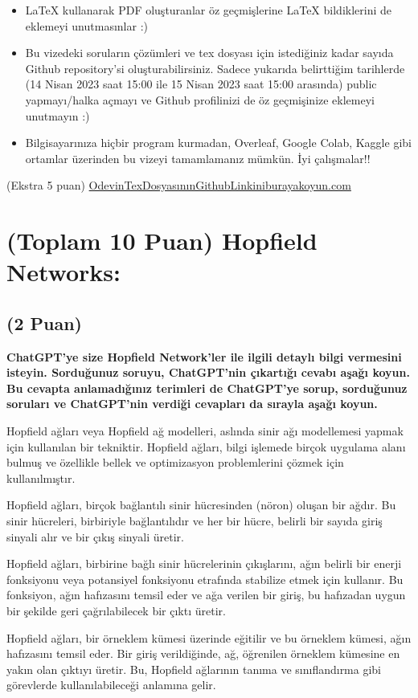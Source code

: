 \documentclass[11pt]{article}
\begin{document}
\begin{itemize}
    \item LaTeX kullanarak PDF oluşturanlar öz geçmişlerine LaTeX bildiklerini de eklemeyi unutmasınlar :)
    \item Bu vizedeki soruların çözümleri ve tex dosyası için istediğiniz kadar sayıda Github repository'si oluşturabilirsiniz. Sadece yukarıda belirttiğim tarihlerde (14 Nisan 2023 saat 15:00 ile 15 Nisan 2023 saat 15:00 arasında) public yapmayı/halka açmayı ve Github profilinizi de öz geçmişinize eklemeyi unutmayın :)
    \item Bilgisayarınıza hiçbir program kurmadan, Overleaf, Google Colab, Kaggle gibi ortamlar üzerinden bu vizeyi tamamlamanız mümkün. İyi çalışmalar!!
\end{itemize}

(Ekstra 5 puan) \url{OdevinTexDosyasınınGithubLinkiniburayakoyun.com}

\newpage
\section{(Toplam 10 Puan) Hopfield Networks:}

\subsection{(2 Puan)} \textbf{ChatGPT’ye size Hopfield Network’ler ile ilgili detaylı bilgi vermesini isteyin. Sorduğunuz soruyu, ChatGPT'nin çıkartığı cevabı aşağı koyun. Bu cevapta anlamadığınız terimleri de ChatGPT’ye sorup, sorduğunuz soruları ve ChatGPT’nin verdiği cevapları da sırayla aşağı koyun.}

    Hopfield ağları veya Hopfield ağ modelleri, aslında sinir ağı modellemesi yapmak için kullanılan bir tekniktir. Hopfield ağları, bilgi işlemede birçok uygulama alanı bulmuş ve özellikle bellek ve optimizasyon problemlerini çözmek için kullanılmıştır.

    Hopfield ağları, birçok bağlantılı sinir hücresinden (nöron) oluşan bir ağdır. Bu sinir hücreleri, birbiriyle bağlantılıdır ve her bir hücre, belirli bir sayıda giriş sinyali alır ve bir çıkış sinyali üretir.

    Hopfield ağları, birbirine bağlı sinir hücrelerinin çıkışlarını, ağın belirli bir enerji fonksiyonu veya potansiyel fonksiyonu etrafında stabilize etmek için kullanır. Bu fonksiyon, ağın hafızasını temsil eder ve ağa verilen bir giriş, bu hafızadan uygun bir şekilde geri çağrılabilecek bir çıktı üretir.

    Hopfield ağları, bir örneklem kümesi üzerinde eğitilir ve bu örneklem kümesi, ağın hafızasını temsil eder. Bir giriş verildiğinde, ağ, öğrenilen örneklem kümesine en yakın olan çıktıyı üretir. Bu, Hopfield ağlarının tanıma ve sınıflandırma gibi görevlerde kullanılabileceği anlamına gelir.
\end{document}
